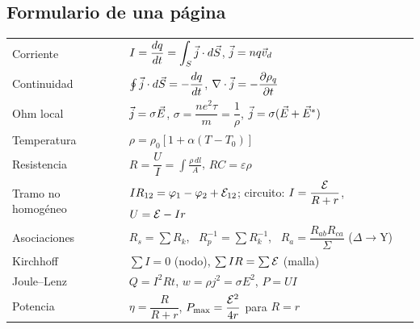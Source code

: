 \documentclass[11pt]{article}
\begin{document}
\subsection{Formulario de una página}
\begin{center}
\small
\renewcommand{\arraystretch}{1.5}
\begin{tabularx}{\linewidth}{@{}lX@{}}
\toprule
Corriente & $I=\dfrac{dq}{dt}=\displaystyle\int_S\vec{j}\cdot d\vec S$, \quad $\vec{j}=nq\vec v_d$\\
Continuidad & $\oint\vec{j}\cdot d\vec S=-\dfrac{dq}{dt}$, \quad $\nabla\cdot\vec{j}=-\dfrac{\partial\rho_q}{\partial t}$\\
Ohm local & $\vec{j}=\sigma\vec{E}$, \quad $\sigma=\dfrac{ne^2\tau}{m}=\dfrac1\rho$, \quad $\vec{j}=\sigma(\vec{E}+\vec{E}^*)$\\
Temperatura & $\rho=\rho_0[1+\alpha(T-T_0)]$\\
Resistencia & $R=\dfrac{U}{I}=\displaystyle\int\frac{\rho\,dl}{A}$, \quad $RC=\varepsilon\rho$\\
Tramo no homogéneo & $IR_{12}=\varphi_1-\varphi_2+\mathcal{E}_{12}$; \quad circuito: $I=\dfrac{\mathcal{E}}{R+r}$, \ $U=\mathcal{E}-Ir$\\
Asociaciones & $R_s=\sum R_k$, \ $R_p^{-1}=\sum R_k^{-1}$, \ $R_a=\dfrac{R_{ab}R_{ca}}{\Sigma}$ ($\Delta\to$Y)\\
Kirchhoff & $\sum I=0$ (nodo), \quad $\sum IR=\sum\mathcal{E}$ (malla)\\
Joule--Lenz & $Q=I^2Rt$, \quad $w=\rho j^2=\sigma E^2$, \quad $P=UI$\\
Potencia & $\eta=\dfrac{R}{R+r}$, \quad $P_{\max}=\dfrac{\mathcal{E}^2}{4r}$ para $R=r$\\
\bottomrule
\end{tabularx}
\end{center}
\end{document}
